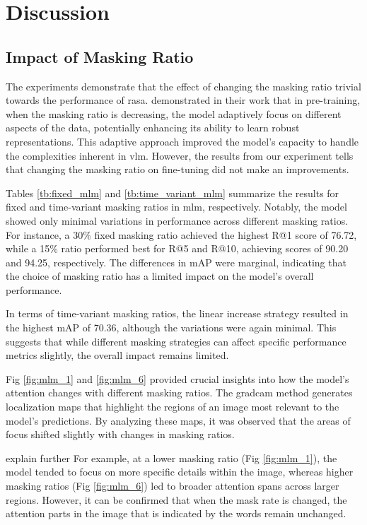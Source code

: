\section{Discussion}
\subsection{Impact of Masking Ratio}

The experiments demonstrate that the effect of changing the masking ratio trivial towards the performance of \acrshort{rasa}. \cite{yang2023learningbettermaskingbetter} demonstrated in their work that in pre-training, when the masking ratio is decreasing, the model adaptively focus on different aspects of the data, potentially enhancing its ability to learn robust representations. This adaptive approach improved the model's capacity to handle the complexities inherent in \acrshort{vlm}. However, the results from our experiment tells that changing the masking ratio on fine-tuning did not make an improvements. 

Tables \ref{tb:fixed_mlm} and \ref{tb:time_variant_mlm} summarize the results for fixed and time-variant masking ratios in \acrshort{mlm}, respectively. Notably, the model showed only minimal variations in performance across different masking ratios. For instance, a 30\% fixed masking ratio achieved the highest R@1 score of 76.72, while a 15\% ratio performed best for R@5 and R@10, achieving scores of 90.20 and 94.25, respectively. The differences in mAP were marginal, indicating that the choice of masking ratio has a limited impact on the model's overall performance.

In terms of time-variant masking ratios, the linear increase strategy resulted in the highest mAP of 70.36, although the variations were again minimal. This suggests that while different masking strategies can affect specific performance metrics slightly, the overall impact remains limited.

Fig \ref{fig:mlm_1} and \ref{fig:mlm_6} provided crucial insights into how the model's attention changes with different masking ratios. The \acrshort{gradcam} method generates localization maps that highlight the regions of an image most relevant to the model's predictions. By analyzing these maps, it was observed that the areas of focus shifted slightly with changes in masking ratios.

{\color{red} explain further}
For example, at a lower masking ratio (Fig \ref{fig:mlm_1}), the model tended to focus on more specific details within the image, whereas higher masking ratios (Fig \ref{fig:mlm_6}) led to broader attention spans across larger regions. However, it can be confirmed that when the mask rate is changed, the attention parts in the image that is  indicated by the words remain unchanged.


